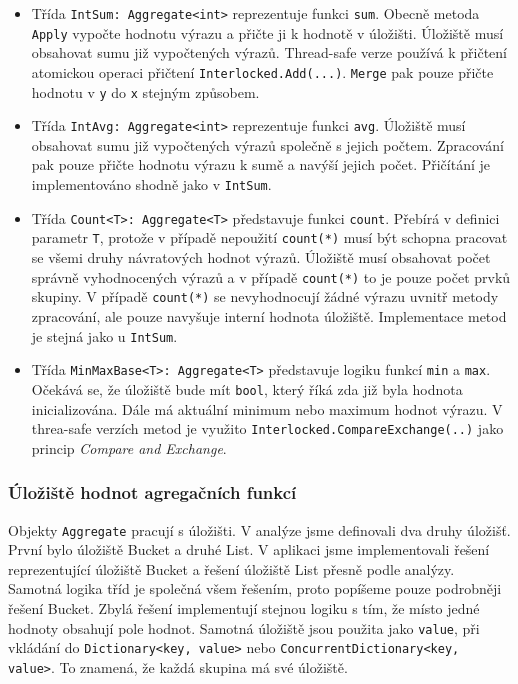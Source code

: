 \begin{itemize}
\item Třída \texttt{IntSum: Aggregate<int>} reprezentuje funkci \texttt{sum}.
Obecně metoda \texttt{Apply} vypočte hodnotu výrazu a přičte ji k hodnotě v úložišti.
Úložiště musí obsahovat sumu již vypočtených výrazů.
Thread-safe verze používá k přičtení atomickou operaci přičtení \texttt{Interlocked.Add(...)}.
\texttt{Merge} pak pouze přičte hodnotu v \texttt{y} do \texttt{x} stejným způsobem.
\item Třída \texttt{IntAvg: Aggregate<int>} reprezentuje funkci \texttt{avg}.
Úložiště musí obsahovat sumu již vypočtených výrazů společně s jejich počtem.
Zpracování pak pouze přičte hodnotu výrazu k sumě a navýší jejich počet.
Přičítání je implementováno shodně jako v \texttt{IntSum}.
\item Třída \texttt{Count<T>: Aggregate<T>} představuje funkci \texttt{count}.
Přebírá v definici parametr \texttt{T}, protože v případě nepoužití \texttt{count(*)} musí být schopna pracovat se všemi druhy návratových hodnot výrazů.
Úložiště musí obsahovat počet správně vyhodnocených výrazů a v případě \texttt{count(*)} to je pouze počet prvků skupiny.
V případě \texttt{count(*)} se nevyhodnocují žádné výrazu uvnitř metody zpracování, ale pouze navyšuje interní hodnota úložiště.
Implementace metod je stejná jako u \texttt{IntSum}.

\item Třída \texttt{MinMaxBase<T>: Aggregate<T>} představuje logiku funkcí \texttt{min} a \texttt{max}.
Očekává se, že úložiště bude mít \texttt{bool}, který říká zda již byla hodnota inicializována.
Dále má aktuální minimum nebo maximum hodnot výrazu. 
V threa-safe verzích metod je využito \texttt{Interlocked.CompareExchange(..)} jako princip \textit{Compare and Exchange}. 
\end{itemize}

\subsubsection{Úložiště hodnot agregačních funkcí}

Objekty \texttt{Aggregate} pracují s úložišti.
V analýze jsme definovali dva druhy úložišť.
První bylo úložiště Bucket a druhé List.
V aplikaci jsme implementovali řešení reprezentující úložiště Bucket a řešení úložiště List přesně podle analýzy.
Samotná logika tříd je společná všem řešením, proto popíšeme pouze podrobněji řešení Bucket.
Zbylá řešení implementují stejnou logiku s tím, že místo jedné hodnoty obsahují pole hodnot.
Samotná úložiště jsou použita jako \texttt{value}, při vkládání do \texttt{Dictionary<key, value>} nebo \texttt{ConcurrentDictionary<key, value>}.
To znamená, že každá skupina má své úložiště.

